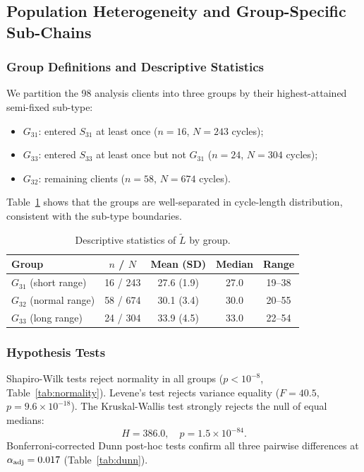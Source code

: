 \documentclass[12pt,a4paper]{article}
\begin{document}
\subsection{Population Heterogeneity and Group-Specific Sub-Chains}
\label{sec:groups}

\subsubsection{Group Definitions and Descriptive Statistics}

We partition the 98 analysis clients into three groups by their
highest-attained semi-fixed sub-type:
\begin{itemize}
  \item \textbf{$G_{31}$}: entered $S_{31}$ at least once
        ($n = 16$, $N = 243$ cycles);
  \item \textbf{$G_{33}$}: entered $S_{33}$ at least once but not $G_{31}$
        ($n = 24$, $N = 304$ cycles);
  \item \textbf{$G_{32}$}: remaining clients ($n = 58$, $N = 674$ cycles).
\end{itemize}

Table~\ref{tab:groups} shows that the groups are well-separated in
cycle-length distribution, consistent with the sub-type boundaries.

\begin{table}[ht]
\centering
\caption{Descriptive statistics of $\tilde{L}$ by group.}
\label{tab:groups}
\begin{tabular}{l cc cc}
\toprule
\textbf{Group} & \textbf{$n$ / $N$} & \textbf{Mean (SD)} & \textbf{Median} & \textbf{Range} \\
\midrule
$G_{31}$ (short range) & 16 / 243 & 27.6 (1.9) & 27.0 & 19--38 \\
$G_{32}$ (normal range) & 58 / 674 & 30.1 (3.4) & 30.0 & 20--55 \\
$G_{33}$ (long range)   & 24 / 304 & 33.9 (4.5) & 33.0 & 22--54 \\
\bottomrule
\end{tabular}
\end{table}

\subsubsection{Hypothesis Tests}

Shapiro-Wilk tests reject normality in all groups ($p < 10^{-8}$, Table~\ref{tab:normality}).
Levene's test rejects variance equality ($F = 40.5$, $p = 9.6 \times 10^{-18}$).
The Kruskal-Wallis test strongly rejects the null of equal medians:
\[
  H = 386.0, \quad p = 1.5 \times 10^{-84}.
\]
Bonferroni-corrected Dunn post-hoc tests confirm all three pairwise differences
at $\alpha_{\rm adj} = 0.017$ (Table~\ref{tab:dunn}).
\end{document}
